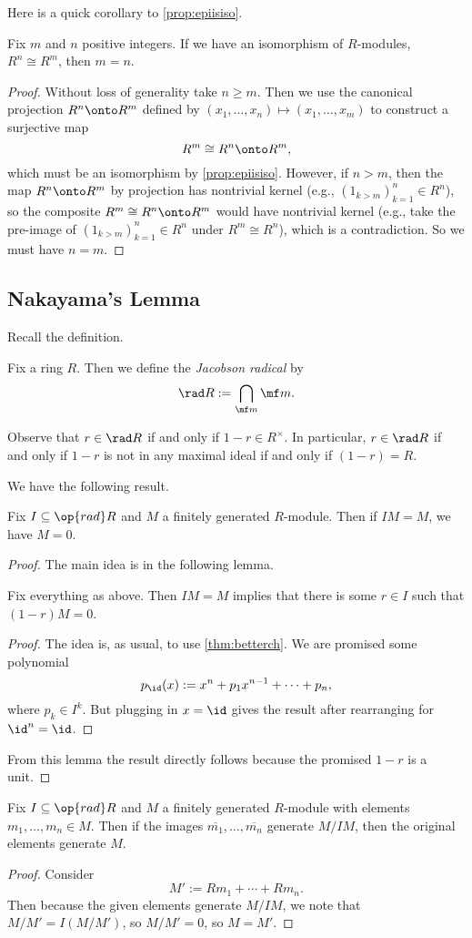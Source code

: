 Here is a quick corollary to \autoref{prop:epiisiso}.
\begin{corollary}
	Fix $m$ and $n$ positive integers. If we have an isomorphism of $R$-modules, $R^n\cong R^m$, then $m=n$.
\end{corollary}
\begin{proof}
	Without loss of generality take $n\ge m$. Then we use the canonical projection $R^n\onto R^m$ defined by $(x_1,\ldots,x_n)\mapsto(x_1,\ldots,x_m)$ to construct a surjective map
	\[R^m\cong R^n\onto R^m,\]
	which must be an isomorphism by \autoref{prop:epiisiso}. However, if $n>m$, then the map $R^n\onto R^m$ by projection has nontrivial kernel (e.g., $(1_{k>m})_{k=1}^n\in R^n$), so the composite $R^m\cong R^n\onto R^m$ would have nontrivial kernel (e.g., take the pre-image of $(1_{k>m})_{k=1}^n\in R^n$ under $R^m\cong R^n$), which is a contradiction. So we must have $n=m$.
\end{proof}

\subsection{Nakayama's Lemma}
Recall the definition.
\begin{definition}
	Fix a ring $R$. Then we define the \textit{Jacobson radical} by
	\[\rad R:=\bigcap_{\mf m}\mf m.\]
\end{definition}
Observe that $r\in\rad R$ if and only if $1-r\in R^\times$. In particular, $r\in\rad R$ if and only if $1-r$ is not in any maximal ideal if and only if $(1-r)=R$.

We have the following result.
\begin{theorem}
	Fix $I\subseteq\op{rad}R$ and $M$ a finitely generated $R$-module. Then if $IM=M$, we have $M=0$.
\end{theorem}
\begin{proof}
	The main idea is in the following lemma.
	\begin{lemma}
		Fix everything as above. Then $IM=M$ implies that there is some $r\in I$ such that $(1-r)M=0$.
	\end{lemma}
	\begin{proof}
		The idea is, as usual, to use \autoref{thm:betterch}. We are promised some polynomial
		\[p_{\id}(x):=x^n+p_1x^{n-1}+\cdots+p_n,\]
		where $p_k\in I^k$. But plugging in $x=\id$ gives the result after rearranging for $\id^n=\id$.
	\end{proof}
	From this lemma the result directly follows because the promised $1-r$ is a unit.
\end{proof}
\begin{corollary}
	Fix $I\subseteq\op{rad}R$ and $M$ a finitely generated $R$-module with elements $m_1,\ldots,m_n\in M$. Then if the images $\overline{m_1},\ldots,\overline{m_n}$ generate $M/IM$, then the original elements generate $M$.
\end{corollary}
\begin{proof}
	Consider
	\[M':=Rm_1+\cdots+Rm_n.\]
	Then because the given elements generate $M/IM$, we note that $M/M'=I(M/M')$, so $M/M'=0$, so $M=M'$. 
\end{proof}

